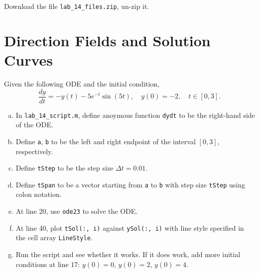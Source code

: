 \documentclass[11pt]{lab-exercise}
\begin{document}
\maketitle
\pagestyle{exercise-style}
\thispagestyle{empty}
Download the file \verb|lab_14_files.zip|, un-zip it.
\section{Direction Fields and Solution Curves}
Given the following ODE and the initial condition,
$$
\frac{dy}{dt} = -y(t) - 5 e^{-t} \sin(5t), \quad y(0) = -2, \quad t \in [0, 3].
$$
\begin{enumerate}[a.]
    \item In \verb|lab_14_script.m|, define anoymous function \verb`dydt` to be the right-hand side of the ODE.
    \item Define \verb`a`, \verb`b` to be the left and right endpoint of the interval $[0, 3]$, respectively.
    \item Define \verb`tStep` to be the step size $\Delta t = 0.01$.
    \item Define \verb`tSpan` to be a vector starting from \verb`a` to \verb`b` with step size \verb`tStep` using colon notation.
    \item At line 20, use \verb`ode23` to solve the ODE.
    \item At line 40, plot \verb`tSol(:, i)` against \verb`ySol(:, i)` with line style specified in the cell array \verb`LineStyle`.
    \item Run the script and see whether it works. If it does work, add more initial conditions at line 17: $y(0) = 0$, $y(0) = 2$, $y(0) = 4$.
\end{enumerate}
\end{document}
